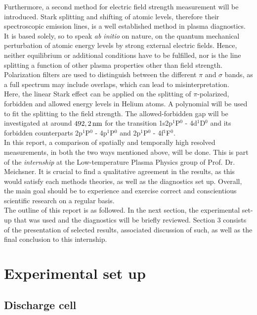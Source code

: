 \documentclass[a4paper,10pt]{article}
\newcommand{\tilt}[1]{\textit{#1}}
\newcommand{\groupname}{Low-temperature Plasma Physics group} %
\begin{document}
		Furthermore, a second method for electric field \linebreak strength measurement will be introduced. Stark splitting and shifting of atomic levels, therefore their spectroscopic emission lines, is a well established method in plasma diagnostics. It is based solely, so to speak \tilt{ab initio} on nature, on the quantum mechanical perturbation of atomic energy levels by strong external electric fields. Hence, neither equilibrium or additional conditions have to be fulfilled, nor is the line splitting a function of other plasma properties other than field strength. Polarization filters are used to distinguish between the different $\pi$ and $\sigma$ bands, as a full spectrum may include overlaps, which can lead to misinterpretation.\\
		Here, the linear Stark effect can be applied on the splitting of $\pi$-polarized, forbidden and allowed energy levels in Helium atoms. A polynomial will be used to fit the splitting to the field strength. The allowed-forbidden gap will be investigated at around $\unit[492,2]{nm}$ for the transition 1s2p$^1$P$^0$ - 4d$^1$D$^0$ and its forbidden counterparts 2p$^1$P$^0$ - 4p$^1$P$^0$ and 2p$^1$P$^0$ - 4f$^1$F$^0$.\\
		In this report, a comparison of spatially and temporally high resolved measurements, in both the two ways mentioned above, will be done. This is part of the \tilt{internship} at the \groupname\,\,of Prof. Dr. Meichsner. It is crucial to find a qualitative agreement in the results, as this would satisfy each methods theories, as well as the diagnostics set up. Overall, the main goal should be to experience and exercise correct and conscientious scientific research on a regular basis.\\
		The outline of this report is as followed. In the next section, the experimental set-up that was used and the diagnostics will be briefly reviewed. Section 3 consists of the presentation of selected results, associated discussion of such, as well as the final conclusion to this internship.

	\section{Experimental set up}
	
		\subsection{Discharge cell}
		
\end{document}
